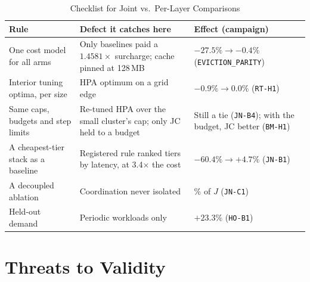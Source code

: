 \documentclass[conference,a4paper]{IEEEtran}
\newcommand{\jcac}{JC}
\newcommand{\jcac}{JCAC}
\newcommand{\rec}[1]{\texttt{\small #1}}
\begin{document}
\begin{table}[!t]
\caption{Checklist for Joint vs.\ Per-Layer Comparisons}
\label{tab:checklist}
\centering
\scriptsize
\setlength{\tabcolsep}{2.5pt}
\begin{tabular}{@{}>{\raggedright\arraybackslash}p{2.0cm}
                >{\raggedright\arraybackslash}p{3.0cm}
                >{\raggedright\arraybackslash}p{3.2cm}@{}}
\toprule
Rule & Defect it catches here & Effect (campaign) \\
\midrule
One cost model for all arms & Only baselines paid a $1.4581\times$
  surcharge; cache pinned at 128\,MB & $-27.5\%\rightarrow-0.4\%$ (\rec{EVICTION\_PARITY}) \\
Interior tuning optima, per size & HPA optimum on a grid edge &
  $-0.9\%\rightarrow0.0\%$ (\rec{RT-H1}) \\
Same caps, budgets and step limits & Re-tuned HPA over the small cluster's
  cap; only \jcac{} held to a budget & Still a tie (\rec{JN-B4}); with the
  budget, \jcac{} better (\rec{BM-H1}) \\
A cheapest-tier stack as a baseline & Registered rule ranked tiers by
  latency, at 3.4$\times$ the cost & $-60.4\%\rightarrow+4.7\%$
  (\rec{JN-B1}) \\
A decoupled ablation & Coordination never isolated & 1.6\% of $J$
  (\rec{JN-C1}) \\
Held-out demand & Periodic workloads only & $+23.3\%$ (\rec{HO-B1}) \\
\bottomrule
\end{tabular}
\end{table}

\section{Threats to Validity}
\label{sec:threats}
\end{document}
